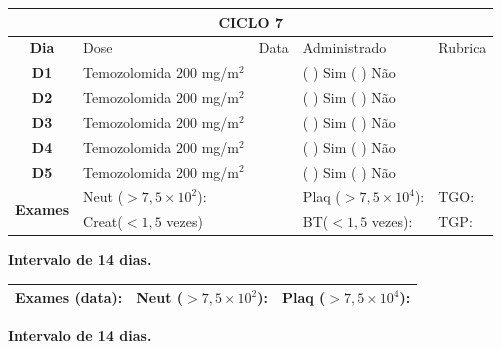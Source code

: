 \documentclass[11pt,a4paper,oldfontcommands]{memoir}
\begin{document}
\begin{center}
\begin{longtable}{p{1cm}p{4cm}|p{1cm}|p{4.6cm}|p{3cm}}
	\hline
	\multicolumn{5}{c}{\textbf{CICLO 7}}\\
\hline
    \multicolumn{1}{c|}{\multirow{1}{*}{\textbf{Dia}}}&{Dose}&{Data}&{Administrado}&{Rubrica} \\
    \hline
    \multicolumn{1}{c|}{\multirow{1}{*}{\textbf{D1}}}&{Temozolomida \(200\) mg/m\(^2\)}&&{(  ) Sim (  ) Não}&\\
    \multicolumn{1}{c|}{\multirow{1}{*}{\textbf{D2}}}&{Temozolomida \(200\) mg/m\(^2\)}&&{(  ) Sim (  ) Não}&\\
    \multicolumn{1}{c|}{\multirow{1}{*}{\textbf{D3}}}&{Temozolomida \(200\) mg/m\(^2\)}&&{(  ) Sim (  ) Não}&\\
    \multicolumn{1}{c|}{\multirow{1}{*}{\textbf{D4}}}&{Temozolomida \(200\) mg/m\(^2\)}&&{(  ) Sim (  ) Não}&\\
    \multicolumn{1}{c|}{\multirow{1}{*}{\textbf{D5}}}&{Temozolomida \(200\) mg/m\(^2\)}&&{(  ) Sim (  ) Não}&\\
    \hline
    \multicolumn{1}{c|}{\multirow{2}{*}{\textbf{Exames}}}&\multicolumn{2}{l|}{Neut (\(>7,5\times10^2\)):}&{Plaq (\(>7,5\times10^4\)):}&{TGO:}\\
    \cline{2-5}
    \multicolumn{1}{c|}{\multirow{2}{*}{{}}}&\multicolumn{2}{l|}{Creat(\(<1,5\) vezes)}&{BT(\(<1,5\) vezes):}&{TGP:}
    \\
    \hline
\end{longtable}
\textbf{Intervalo de 14 dias.}
\begin{longtable}{p{5cm}|p{5cm}|p{4.5cm}}
    \hline
    \textbf{Exames (data):}&{Neut (\(>7,5\times10^2\)):}&{Plaq (\(>7,5\times10^4\)):}
    \\
    \hline
\end{longtable}
\textbf{Intervalo de 14 dias.}
\\[1.5cm]
\end{center}
\end{document}
